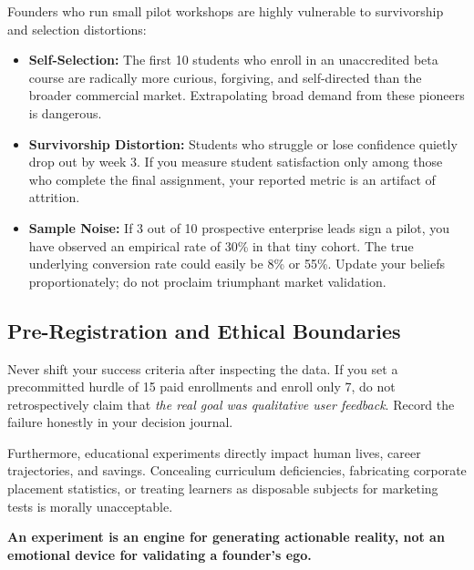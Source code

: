 Founders who run small pilot workshops are highly vulnerable to survivorship and selection distortions:
\begin{itemize}[leftmargin=10pt,itemsep=1pt,topsep=1pt]
  \item \textbf{Self-Selection:} The first 10 students who enroll in an unaccredited beta course are radically more curious, forgiving, and self-directed than the broader commercial market. Extrapolating broad demand from these pioneers is dangerous.
  \item \textbf{Survivorship Distortion:} Students who struggle or lose confidence quietly drop out by week 3. If you measure student satisfaction only among those who complete the final assignment, your reported metric is an artifact of attrition.
  \item \textbf{Sample Noise:} If 3 out of 10 prospective enterprise leads sign a pilot, you have observed an empirical rate of 30\% in that tiny cohort. The true underlying conversion rate could easily be 8\% or 55\%. Update your beliefs proportionately; do not proclaim triumphant market validation.
\end{itemize}

\subsection{Pre-Registration and Ethical Boundaries}

Never shift your success criteria after inspecting the data. If you set a precommitted hurdle of 15 paid enrollments and enroll only 7, do not retrospectively claim that \textit{the real goal was qualitative user feedback}. Record the failure honestly in your decision journal.

Furthermore, educational experiments directly impact human lives, career trajectories, and savings. Concealing curriculum deficiencies, fabricating corporate placement statistics, or treating learners as disposable subjects for marketing tests is morally unacceptable.

\textbf{An experiment is an engine for generating actionable reality, not an emotional device for validating a founder's ego.}
